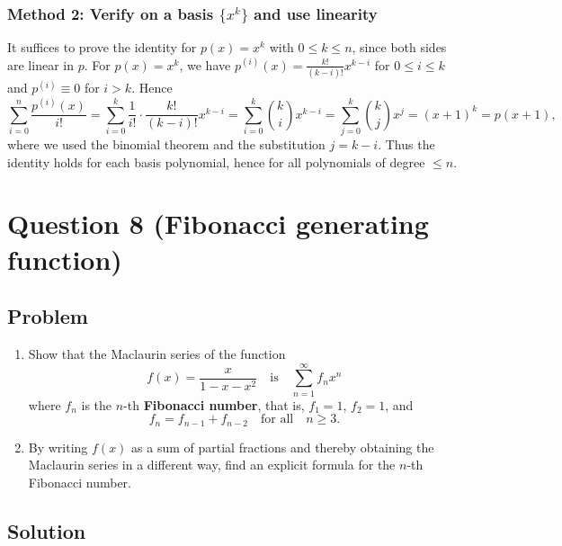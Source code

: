 \documentclass[12pt]{article}
\begin{document}
\subsubsection*{Method 2: Verify on a basis \(\{x^k\}\) and use linearity}
It suffices to prove the identity for \(p(x)=x^k\) with \(0\le k\le n\), since both sides are linear in \(p\).
For \(p(x)=x^k\), we have \(p^{(i)}(x)=\frac{k!}{(k-i)!}x^{k-i}\) for \(0\le i\le k\) and \(p^{(i)}\equiv 0\) for \(i>k\).
Hence
\[
\sum_{i=0}^{n}\frac{p^{(i)}(x)}{i!}
=\sum_{i=0}^{k}\frac{1}{i!}\cdot \frac{k!}{(k-i)!}x^{k-i}
=\sum_{i=0}^{k}\binom{k}{i}x^{k-i}
=\sum_{j=0}^{k}\binom{k}{j}x^{j}
=(x+1)^k=p(x+1),
\]
where we used the binomial theorem and the substitution \(j=k-i\).
Thus the identity holds for each basis polynomial, hence for all polynomials of degree \(\le n\).

\newpage
\section*{Question 8 (Fibonacci generating function)}
\subsection*{Problem}
\begin{enumerate}[label=(\alph*)]
  \item Show that the Maclaurin series of the function
  \[
  f(x)=\frac{x}{1-x-x^2} \quad \text{is} \quad \sum_{n=1}^{\infty} f_n x^n 
  \]
  where \(f_n\) is the \(n\)-th \textbf{Fibonacci number}, that is, \(f_1=1\), \(f_2=1\), and 
  \[
  f_n=f_{n-1}+f_{n-2} \quad \text{for all} \quad n\ge 3. 
  \]
  \item By writing \(f(x)\) as a sum of partial fractions and thereby obtaining the Maclaurin series in a different way, find an explicit formula for the \(n\)-th Fibonacci number.
\end{enumerate}

\subsection*{Solution}
\end{document}
